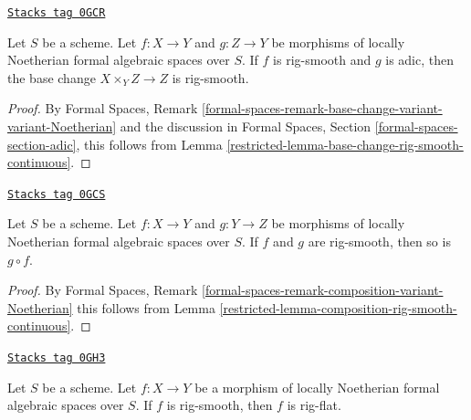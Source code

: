 \begin{lemma}
\label{restricted-lemma-base-change-rig-smooth}
\href{https://stacks.math.columbia.edu/tag/0GCR}{\texttt{Stacks tag 0GCR}}

Let $S$ be a scheme. Let $f : X \to Y$ and $g : Z \to Y$
be morphisms of locally Noetherian formal algebraic spaces over $S$.
If $f$ is rig-smooth and $g$ is adic, then the base change
$X \times_Y Z \to Z$ is rig-smooth.
\end{lemma}

\begin{proof}

By Formal Spaces, Remark
\ref{formal-spaces-remark-base-change-variant-variant-Noetherian}
and the discussion in Formal Spaces, Section
\ref{formal-spaces-section-adic},
this follows from Lemma \ref{restricted-lemma-base-change-rig-smooth-continuous}.
\end{proof}

\begin{lemma}
\label{restricted-lemma-composition-rig-smooth}
\href{https://stacks.math.columbia.edu/tag/0GCS}{\texttt{Stacks tag 0GCS}}

Let $S$ be a scheme. Let $f : X \to Y$ and $g : Y \to Z$
be morphisms of locally Noetherian formal algebraic spaces over $S$.
If $f$ and $g$ are rig-smooth, then so is $g \circ f$.
\end{lemma}

\begin{proof}

By Formal Spaces, Remark
\ref{formal-spaces-remark-composition-variant-Noetherian}
this follows from Lemma \ref{restricted-lemma-composition-rig-smooth-continuous}.
\end{proof}

\begin{lemma}
\label{restricted-lemma-rig-smooth-rig-flat-morphism}
\href{https://stacks.math.columbia.edu/tag/0GH3}{\texttt{Stacks tag 0GH3}}

Let $S$ be a scheme. Let $f : X \to Y$ be a morphism of
locally Noetherian formal algebraic spaces over $S$.
If $f$ is rig-smooth, then $f$ is rig-flat.
\end{lemma}


